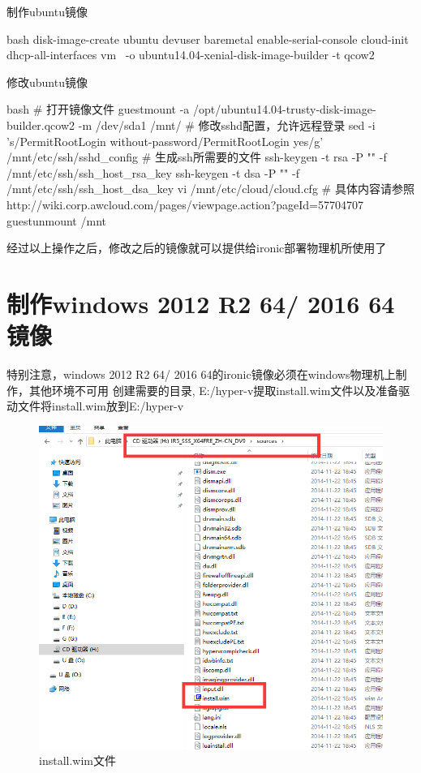 制作ubuntu镜像
\begin{code-block}{bash}
disk-image-create ubuntu devuser baremetal enable-serial-console cloud-init dhcp-all-interfaces vm \
        -o ubuntu14.04-xenial-disk-image-builder -t qcow2
\end{code-block}

修改ubuntu镜像
\begin{code-block}{bash}
# 打开镜像文件
guestmount -a /opt/ubuntu14.04-trusty-disk-image-builder.qcow2 -m /dev/sda1 /mnt/
# 修改sshd配置，允许远程登录
sed -i 's/PermitRootLogin without-password/PermitRootLogin yes/g' /mnt/etc/ssh/sshd_config
# 生成ssh所需要的文件
ssh-keygen  -t rsa -P "" -f  /mnt/etc/ssh/ssh_host_rsa_key
ssh-keygen  -t dsa -P "" -f  /mnt/etc/ssh/ssh_host_dsa_key
vi /mnt/etc/cloud/cloud.cfg
# 具体内容请参照 http://wiki.corp.awcloud.com/pages/viewpage.action?pageId=57704707
guestunmount /mnt
\end{code-block}

经过以上操作之后，修改之后的镜像就可以提供给ironic部署物理机所使用了

\section{制作windows 2012 R2 64/ 2016 64镜像}
特别注意，windows 2012 R2 64/ 2016 64的ironic镜像必须在windows物理机上制作，其他环境不可用
创建需要的目录, E:/hyper-v提取install.wim文件以及准备驱动文件将install.wim放到E:/hyper-v
\begin{figure}[H]
  \centering
  \includegraphics[scale=0.4]{installwim.png}
  \caption{install.wim文件}
  \label{fig:installwim}
\end{figure}

